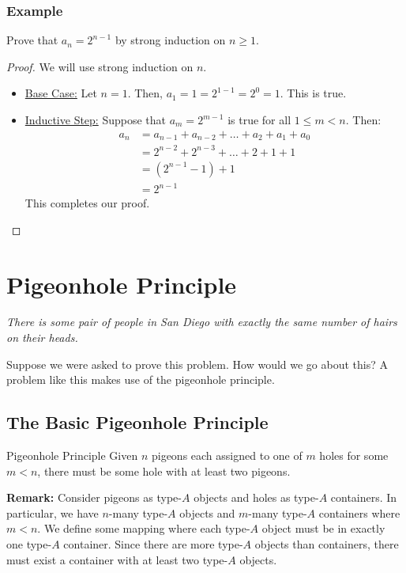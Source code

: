 \documentclass[letterpaper]{article}
\begin{document}
\subsubsection{Example}
Prove that $a_n = 2^{n - 1}$ by strong induction on $n \geq 1$. 

\begin{proof}
    We will use strong induction on $n$.
    \begin{itemize}
        \item[\mdiamond] \underline{Base Case:} Let $n = 1$. Then, $a_1 = 1 = 2^{1 - 1} = 2^0 = 1$. This is true.
        \item[\mdiamond] \underline{Inductive Step:} Suppose that $a_m = 2^{m - 1}$ is true for all $1 \leq m < n$. Then:
        \begin{equation*}
            \begin{aligned}
                a_n &= a_{n - 1} + a_{n - 2} + \dots + a_2 + a_1 + a_0 \\ 
                    &= 2^{n - 2} + 2^{n - 3} + \dots + 2 + 1 + 1 \\ 
                    &= (2^{n - 1} - 1) + 1 \\
                    &= 2^{n - 1}
            \end{aligned}        
        \end{equation*}  
        This completes our proof. \qedhere 
    \end{itemize}
\end{proof}






\newpage
\section{Pigeonhole Principle}
\emph{There is some pair of people in San Diego with exactly the same number of hairs on their heads.}

\bigskip 

Suppose we were asked to prove this problem. How would we go about this? A problem like this makes use of the pigeonhole principle. 

\subsection{The Basic Pigeonhole Principle}
\begin{theorem}{Pigeonhole Principle}{}
    Given $n$ pigeons each assigned to one of $m$ holes for some $m < n$, there must be some hole with at least two pigeons. 
\end{theorem}
\textbf{Remark:} Consider pigeons as type-$A$ objects and holes as type-$A$ containers. In particular, we have $n$-many type-$A$ objects and $m$-many type-$A$ containers where $m < n$. We define some mapping where each type-$A$ object must be in exactly one type-$A$ container. Since there are more type-$A$ objects than containers, there must exist a container with at least two type-$A$ objects.
\end{document}
